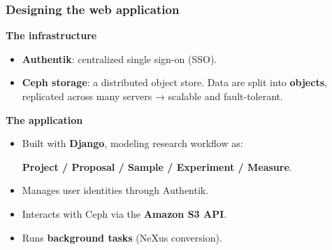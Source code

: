 \documentclass{beamer}
\begin{document}
\begin{frame}
	\end{frame}
	
	\begin{frame}
		\frametitle{Designing the web application}
		
		\textbf{The infrastructure}
		\begin{itemize}
			\item \textbf{Authentik}: centralized single sign-on (SSO).
			\item \textbf{Ceph storage}: a distributed object store.  
			Data are split into \textbf{objects}, replicated across many servers → scalable and fault-tolerant.
		\end{itemize}
		
		\vspace{0.8em}
		
		\textbf{The application}
		\begin{itemize}
			\item Built with \textbf{Django}, modeling research workflow as:  
			
			\textbf{Project / Proposal / Sample / Experiment / Measure}.
			\item Manages user identities through Authentik.
			\item Interacts with Ceph via the \textbf{Amazon S3 API}.
			\item Runs \textbf{background tasks} (NeXus conversion).
		\end{itemize}
	\end{frame}
	
\end{document}
